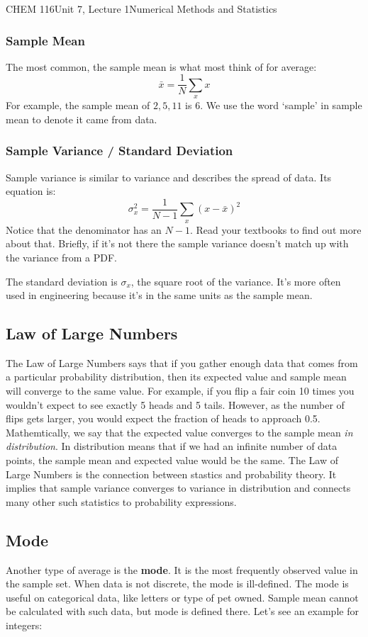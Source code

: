 \documentclass{article}
\begin{document}
\begin{tdoc}{CHEM 116}{Unit 7, Lecture 1}{Numerical Methods and Statistics}
\subsubsection{Sample Mean}
The most common, the sample mean is what most think of for average:
\begin{equation}
\bar{x} = \frac{1}{N}\sum_x x
\end{equation}
For example, the sample mean of $2,5,11$ is 6. We use the word
`sample' in sample mean to denote it came from data.

\subsubsection{Sample Variance / Standard Deviation}
Sample variance is similar to variance and describes the spread of
data. Its equation is:
\begin{equation}
\sigma_x^2 = \frac{1}{N - 1} \sum_x (x - \bar{x})^2
\end{equation}
Notice that the denominator has an $N - 1$. Read your textbooks to
find out more about that. Briefly, if it's not there the sample
variance doesn't match up with the variance from a PDF.

The standard deviation is $\sigma_x$, the square root of the
variance. It's more often used in engineering because it's in the same
units as the sample mean.

\subsection{Law of Large Numbers}

The Law of Large Numbers says that if you gather enough data that comes from a particular probability distribution, then its expected value and sample mean will converge to the same value. For example, if you flip a fair coin 10 times you wouldn't expect to see exactly 5 heads and 5 tails. However, as the number of flips gets larger, you would expect the fraction of heads to approach 0.5. Mathemtically, we say that the expected value converges to the sample mean \textit{in distribution}. In distribution means that if we had an infinite number of data points, the sample mean and expected value would be the same. The Law of Large Numbers is the connection between stastics and probability theory. It implies that sample variance converges to variance in distribution and connects many other such statistics to probability expressions.


\subsection{Mode}
Another type of average is the \textbf{mode}. It is the most frequently observed value in the sample set. When data is not discrete, the mode is ill-defined. The mode is useful on categorical data, like letters or type of pet owned. Sample mean cannot be calculated with such data, but mode is defined there. Let's see an example for integers:


\end{tdoc}
\end{document}
